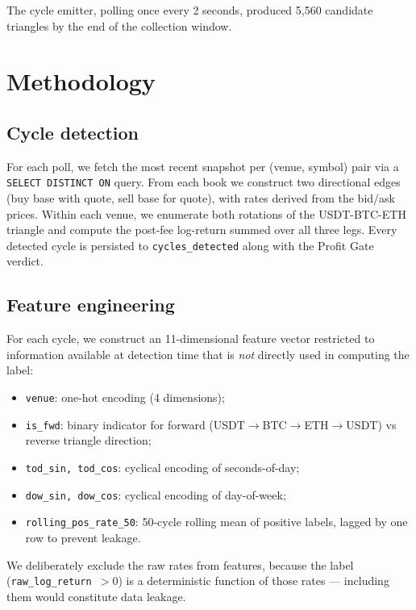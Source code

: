 \documentclass[11pt,a4paper]{article}
\begin{document}
The cycle emitter, polling once every 2 seconds, produced 5{,}560 candidate triangles by the end of the collection window.

\section{Methodology}
\label{sec:methods}

\subsection{Cycle detection}
For each poll, we fetch the most recent snapshot per (venue, symbol) pair via a \texttt{SELECT DISTINCT ON} query. From each book we construct two directional edges (buy base with quote, sell base for quote), with rates derived from the bid/ask prices. Within each venue, we enumerate both rotations of the USDT-BTC-ETH triangle and compute the post-fee log-return summed over all three legs. Every detected cycle is persisted to \texttt{cycles\_detected} along with the Profit Gate verdict.

\subsection{Feature engineering}
For each cycle, we construct an 11-dimensional feature vector restricted to information available at detection time that is \emph{not} directly used in computing the label:
\begin{itemize}
    \item \texttt{venue}: one-hot encoding (4 dimensions);
    \item \texttt{is\_fwd}: binary indicator for forward (USDT$\to$BTC$\to$ETH$\to$USDT) vs reverse triangle direction;
    \item \texttt{tod\_sin, tod\_cos}: cyclical encoding of seconds-of-day;
    \item \texttt{dow\_sin, dow\_cos}: cyclical encoding of day-of-week;
    \item \texttt{rolling\_pos\_rate\_50}: 50-cycle rolling mean of positive labels, lagged by one row to prevent leakage.
\end{itemize}

We deliberately exclude the raw rates from features, because the label (\texttt{raw\_log\_return $> 0$}) is a deterministic function of those rates --- including them would constitute data leakage.
\end{document}
